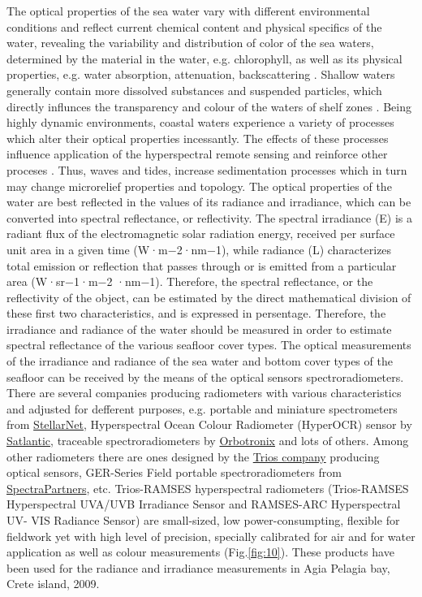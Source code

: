 \documentclass[10pt, a4paper]{article}
\begin{document}
The optical properties of the sea water vary with different environmental conditions and reflect
current chemical content and physical specifics of the water, revealing the variability and distribution
of color of the sea waters, determined by the material in the water, e.g. chlorophyll, as well as its
physical properties, e.g. water absorption, attenuation, backscattering \cite{Maffione01a}\label{Maffione01a}.
Shallow waters generally contain more dissolved substances and suspended particles, which directly
influnces the transparency and colour of the waters of shelf zones \cite{Jerlov52}\label{Jerlov52}. Being highly
dynamic environments, coastal waters experience a variety of processes which alter their optical
properties incessantly. The effects of these processes influence application of the hyperspectral
remote sensing and reinforce other proceses \cite{Maffione01b}\label{Maffione01b}. Thus, waves and tides, increase
sedimentation processes which in turn may change microrelief properties and topology. 
The optical properties of the water are best reflected in the values of its radiance and irradiance,
which can be converted into spectral reflectance, or reflectivity. The spectral irradiance (E) is a
radiant flux of the electromagnetic solar radiation energy, received per surface unit area in a given
time (W·m−2·nm−1), while radiance (L) characterizes total emission or reflection that passes through
or is emitted from a particular area (W·sr−1·m−2 ·nm−1). Therefore, the spectral reflectance, or the
reflectivity of the object, can be estimated by the direct mathematical division of these first two
characteristics, and is expressed in persentage.
Therefore, the irradiance and radiance of the water should be measured in order to estimate spectral
reflectance of the various seafloor cover types. The optical measurements of the irradiance and
radiance of the sea water and bottom cover types of the seafloor can be received by the means of the
optical sensors spectroradiometers. There are several companies producing radiometers with various
characteristics and adjusted for defferent purposes, e.g. portable and miniature spectrometers from
\href{http://www.stellarnet.us}{StellarNet}, Hyperspectral Ocean Colour Radiometer (HyperOCR) sensor by
\href{http://www.satlantic.com}{Satlantic}, traceable spectroradiometers by \href{http://www.orboptronix.com}{Orbotronix} 
and lots of others. Among other radiometers there are ones designed by the \href{http://www.trios.de/}{Trios company} producing
optical sensors, GER-Series Field portable spectroradiometers from
\href{http://www.spectrapartners.nl/}{SpectraPartners}, etc. Trios-RAMSES hyperspectral radiometers
(Trios-RAMSES Hyperspectral UVA/UVB Irradiance Sensor and RAMSES-ARC Hyperspectral UV-
VIS Radiance Sensor) are small-sized, low power-consumpting, flexible for fieldwork yet with high
level of precision, specially calibrated for air and for water application as well as colour
measurements  (Fig.\ref{fig:10}). These products have been used for the radiance and irradiance
measurements in Agia Pelagia bay, Crete island, 2009.
\end{document}
